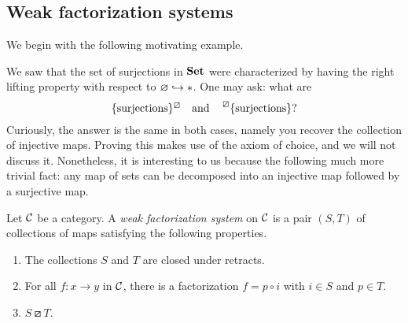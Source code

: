 \subsection{Weak factorization systems}
We begin with the following motivating example.
\begin{example}
	We saw that the set of surjections in \(\mathbf{Set}\) were characterized by having the right lifting property with respect to \(\varnothing\hookrightarrow*\). One may ask: what are
	\[  \{\text{surjections}\}^\boxslash \quad\text{and}\quad\prescript{\boxslash}{}{\{\text{surjections}\}}? \]
	Curiously, the answer is the same in both cases, namely you recover the collection of injective maps. Proving this makes use of the axiom of choice, and we will not discuss it.
	Nonetheless, it is interesting to us because the following much more trivial fact: any map of sets can be decomposed into an injective map followed by a surjective map.
\end{example}
\begin{definition}\label{definition:factorization-system}
	Let \(\mathcal{C}\) be a category. A \emph{weak factorization system} on \(\mathcal{C}\) is a pair \((S,T)\) of collections of maps satisfying the following properties.
	\begin{enumerate}[label=(\alph*)]
		\item The collections \(S\) and \(T\) are closed under retracts.
		\item For all \(f\!:x\to y\) in \(\mathcal{C}\), there is a factorization \(f = p\circ i\) with \(i\in S\) and \(p\in T\).
		\item \(S\boxslash T\).
	\end{enumerate}
\end{definition}


